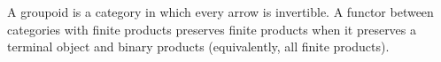 \begin{definition}\label{fga-def-1-17}\uses{}
A groupoid is a category in which every arrow is invertible.  A functor between
categories with finite products preserves finite products when it preserves a
terminal object and binary products (equivalently, all finite products).
\end{definition}